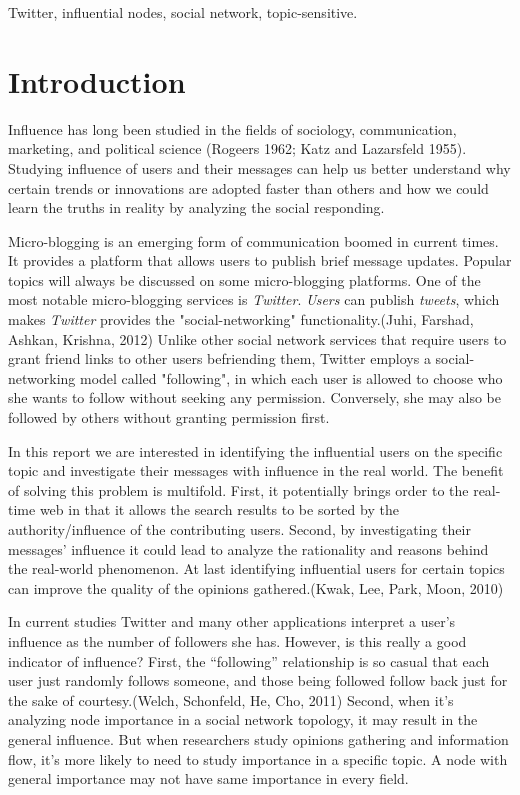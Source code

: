 \documentclass[conference]{IEEEtran}
\theoremstyle{definition}
\begin{document}
\begin{IEEEkeywords}
Twitter, influential nodes, social network, topic-sensitive.
\end{IEEEkeywords}



\section{Introduction}

Influence has long been studied in the fields of sociology, communication, marketing, and political science (Rogeers 1962; Katz and Lazarsfeld 1955). Studying influence of users and their messages can help us better understand why certain trends or innovations are adopted faster than others and how we could learn the truths in reality by analyzing the social responding. 

Micro-blogging is an emerging form of communication boomed in current times. It
provides a platform that allows users to publish brief message updates. Popular
topics will always be discussed on some micro-blogging platforms. One of the most notable micro-blogging services is \textit{Twitter}. \textit{Users} can publish \textit{tweets}, which makes \textit{Twitter} provides the "social-networking" functionality.(Juhi, Farshad, Ashkan, Krishna, 2012) Unlike other social network services that require users to grant friend links to other users befriending them, \textup{Twitter} employs a social-networking model called "following", in which each \textup{user} is allowed to choose who she wants to follow without seeking any permission. Conversely, she may also be followed by others without granting permission first. 

In this report we are interested in identifying the influential \textup{users}
on the specific topic and investigate their messages with influence in the real
world. The benefit of solving this problem is multifold. First, it potentially
brings order to the real-time web in that it allows the search results to be
sorted by the authority/influence of the contributing \textup{users}. Second, by investigating their messages' influence it could lead to analyze the rationality and reasons behind the real-world phenomenon. At last identifying influential \textup{users} for certain topics can improve the quality of the opinions gathered.(Kwak, Lee, Park, Moon, 2010)

In current studies \textup{Twitter} and many other applications interpret a \textup{user's} influence as the number of followers she has. However, is this really a good indicator of influence? First, the “following” relationship is so casual that each \textup{user} just randomly follows someone, and those being followed follow back just for the sake of courtesy.(Welch, Schonfeld, He, Cho, 2011) Second, when it's analyzing node importance in a social network topology, it may result in the general influence. But when researchers study opinions gathering and information flow, it's more likely to need to study importance in a specific topic. A node with general importance may not have same importance in every field. 
\end{document}
